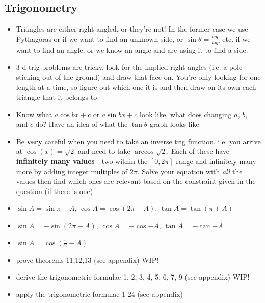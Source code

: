 \documentclass[10pt,a4paper]{article}
\begin{document}
\subsection{Trigonometry}
    \begin{itemize}
        \item Triangles are either right angled, or they're not! In the former case we use Pythagoras or
            if we want to find an unknown side, or $\sin{\theta} = \frac{opp}{hyp}$ etc. if we want to find an angle, or we know an angle and are using it to find a side.
        \item 3-d trig problems are tricky, look for the implied right angles (i.e. a pole sticking out of the ground) and draw that face on. You're only looking for one length at a time, so figure out which one it is and then draw on its own each triangle that it belongs to
        \item Know what $a\cos{bx}+c$ or $a\sin{bx}+c$ look like, what does changing $a$, $b$, and $c$ do? Have an idea of what the $\tan{\theta}$ graph looks like
        \item Be \textbf{very} careful when you need to take an inverse trig function. i.e. you arrive at $\cos(x) = \sqrt{2}$ and need to take $\arccos{\sqrt{2}}$. Each of these have \textbf{infinitely many values} - two within the $[0,2\pi]$ range and infinitely many more by adding integer multiples of $2\pi$. Solve your equation with \textit{all} the values then find which ones are relevant based on the constraint given in the question (if there is one)
        \item $\sin{A} = \sin{\pi-A}$, $\cos{A} = \cos{(2\pi-A)}$, $\tan A = \tan{(\pi+A)}$
        \item $\sin{A}=-\sin{(2\pi-A)}$, $\cos{A} = -\cos{-A}$, $\tan A = -\tan{-A}$
        \item $\sin{A}=\cos{(\frac{\pi}{2}-A)}$
        \item prove theorems 11,12,13 (see appendix) \textcolor{gren2}{WIP!}
        \item derive the trigonometric formulae 1, 2, 3, 4, 5, 6, 7, 9 (see appendix) \textcolor{gren2}{WIP!}
        \item apply the trigonometric formulae 1-24 (see appendix)
    \end{itemize}
\end{document}

